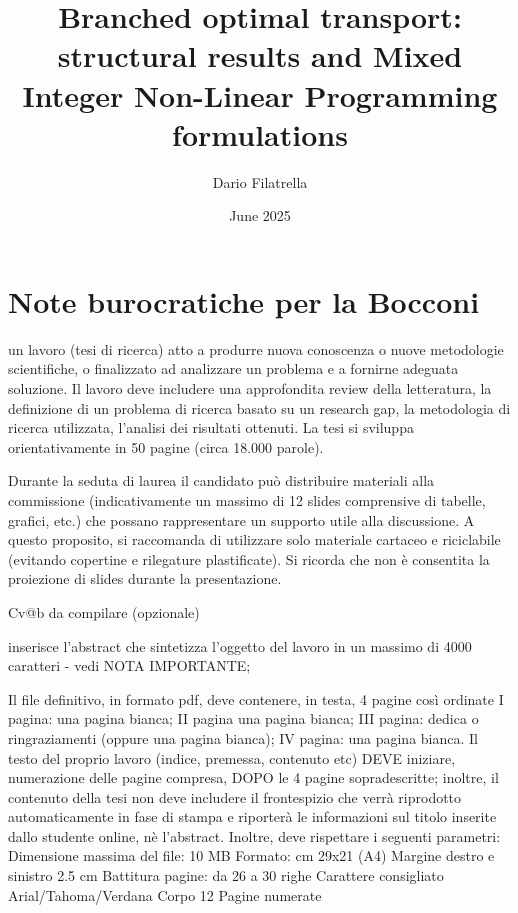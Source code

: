\documentclass[12pt,a4paper]{article}
\author{Dario Filatrella}
\title{Branched optimal transport: structural results and Mixed Integer Non-Linear Programming formulations}
\date{June 2025}
\numberwithin{equation}{section}
\theoremstyle{mytheorem}
\theoremstyle{myremark}
\theoremstyle{myparagraph}
\begin{document}
    \large


    \maketitle

    \newpage

    \tableofcontents

    \newpage

    \setcounter{page}{1}
    \thispagestyle{empty}


    \section*{Note burocratiche per la Bocconi}

    un lavoro (tesi di ricerca) atto a produrre nuova conoscenza o nuove metodologie
    scientifiche, o finalizzato ad analizzare un problema e a fornirne adeguata soluzione.
    Il lavoro deve includere una approfondita review della letteratura, la definizione di un
    problema di ricerca basato su un research gap, la metodologia di ricerca utilizzata,
    l’analisi dei risultati ottenuti.
    La tesi si sviluppa orientativamente in 50 pagine (circa 18.000 parole).

    Durante la seduta di laurea il candidato può distribuire materiali alla commissione (indicativamente un
    massimo di 12 slides comprensive di tabelle, grafici, etc.) che possano rappresentare un supporto utile
    alla discussione. A questo proposito, si raccomanda di utilizzare solo materiale cartaceo e riciclabile
    (evitando copertine e rilegature plastificate). Si ricorda che non è consentita la proiezione di slides
    durante la presentazione.

    Cv@b da compilare (opzionale)

    inserisce l’abstract che sintetizza l’oggetto del lavoro in un massimo di 4000
    caratteri - vedi NOTA IMPORTANTE;

    Il file definitivo, in formato pdf, deve contenere, in testa, 4 pagine così ordinate
    I pagina: una pagina bianca;
    II pagina una pagina bianca;
    III pagina: dedica o ringraziamenti (oppure una pagina bianca);
    IV pagina: una pagina bianca.
    Il testo del proprio lavoro (indice, premessa, contenuto etc) DEVE iniziare, numerazione delle
    pagine compresa, DOPO le 4 pagine sopradescritte; inoltre, il contenuto della tesi non deve
    includere il frontespizio che verrà riprodotto automaticamente in fase di stampa e riporterà le
    informazioni sul titolo inserite dallo studente online, nè l'abstract.
    Inoltre, deve rispettare i seguenti parametri:
    Dimensione massima del file: 10 MB
    Formato: cm 29x21 (A4)
    Margine destro e sinistro 2.5 cm
    Battitura pagine: da 26 a 30 righe
    Carattere consigliato Arial/Tahoma/Verdana
    Corpo 12
    Pagine numerate
\end{document}
